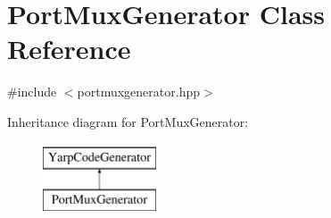 \hypertarget{classPortMuxGenerator}{\section{Port\-Mux\-Generator Class Reference}
\label{classPortMuxGenerator}
}


{\ttfamily \#include $<$portmuxgenerator.\-hpp$>$}

Inheritance diagram for Port\-Mux\-Generator\-:\begin{figure}[H]
\begin{center}
\leavevmode
\includegraphics[height=2.000000cm]{classPortMuxGenerator}
\end{center}
\end{figure}
